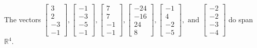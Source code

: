 \begin{exercise}
\begin{exerciseStatement}
  \end{exerciseStatement}
  \begin{exerciseAnswer}
   The vectors \(\left[\begin{array}{r}
3 \\
2 \\
-3 \\
-1
\end{array}\right] , \left[\begin{array}{r}
-1 \\
-3 \\
-5 \\
-1
\end{array}\right] , \left[\begin{array}{r}
7 \\
7 \\
-1 \\
-1
\end{array}\right] , \left[\begin{array}{r}
-24 \\
-16 \\
24 \\
8
\end{array}\right] , \left[\begin{array}{r}
-1 \\
4 \\
-2 \\
-5
\end{array}\right] , \text{ and } \left[\begin{array}{r}
-2 \\
-2 \\
-3 \\
-4
\end{array}\right]\) 
  	 do  
	span \(\mathbb{R}^4\).
  


  \end{exerciseAnswer}
\end{exercise}